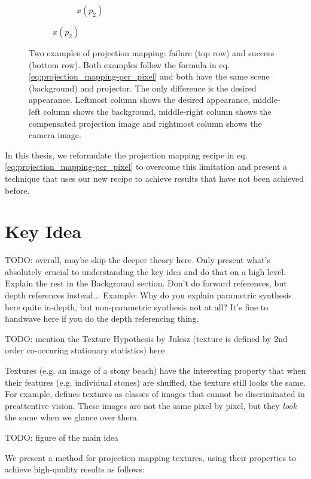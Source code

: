 \begin{figure}[ht]
\begin{subfigure}{\textwidth}
\begin{subfigure}{0.2\textwidth}
            \caption*{\(x(p_2)\)}
            \label{fig:intro_pixels_vs_stats-stats_proj}
        \end{subfigure}
    \end{subfigure}
    \caption{Two examples of projection mapping: failure (top row) and success (bottom row). Both examples follow the formula in eq. \ref{eq:projection_mapping-per_pixel} and both have the same scene (background) and projector. The only difference is the desired appearance. Leftmost column shows the desired appearance, middle-left column shows the background, middle-right column shows the compensated projection image and rightmost column shows the camera image.}
    \label{fig:intro_pixels_vs_stats}
\end{figure}

In this thesis, we reformulate the projection mapping recipe in eq. \ref{eq:projection_mapping-per_pixel} to overcome this limitation and present a technique that uses our new recipe to achieve results that have not been achieved before.

\section{Key Idea}
\label{section:intro-key_idea}

{\color{red} TODO: overall, maybe skip the deeper theory here. Only present what's absolutely crucial to understanding the key idea and do that on a high level. Explain the rest in the Background section. Don't do forward references, but depth references instead... Example: Why do you explain parametric synthesis here quite in-depth, but non-parametric synthesis not at all? It's fine to handwave here if you do the depth referencing thing.}

{\color{red} TODO: mention the Texture Hypothesis by Julesz (texture is defined by 2nd order co-occuring stationary statistics) here}

Textures (e.g. an image of a stony beach) have the interesting property that when their features (e.g. individual stones) are shuffled, the texture still looks the same. For example, \citet*{Julesz1995} defines textures as classes of images that cannot be discriminated in preattentive vision. These images are not the same pixel by pixel, but they \textit{look} the same when we glance over them.

{\color{red} TODO: figure of the main idea}

We present a method for projection mapping textures, using their properties to achieve high-quality results as follows:

